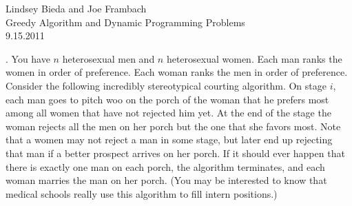 \documentclass[10pt]{article}
\begin{document}
	\begin{flushright}
	Lindsey Bieda and Joe Frambach\\
	Greedy Algorithm and Dynamic Programming Problems\\
	9.15.2011
	\end{flushright}
	. You have $n$ heterosexual men and $n$ heterosexual women.  Each man ranks the women in order of
			preference.   Each woman ranks the men in order of preference.   Consider the following incredibly
			stereotypical courting algorithm. On stage $i$, each man goes to pitch woo on the porch of the woman
			that he prefers most among all women that have not rejected him yet.  At the end of the stage the
			woman rejects all the men on her porch but the one that she favors most.  Note that a women may
			not reject a man in some stage, but later end up rejecting that man if a better prospect arrives on her
			porch. If it should ever happen that there is exactly one man on each porch, the algorithm terminates,
			and each woman marries the man on her porch. (You may be interested to know that medical schools
			really use this algorithm to fill intern positions.)
\end{document}

